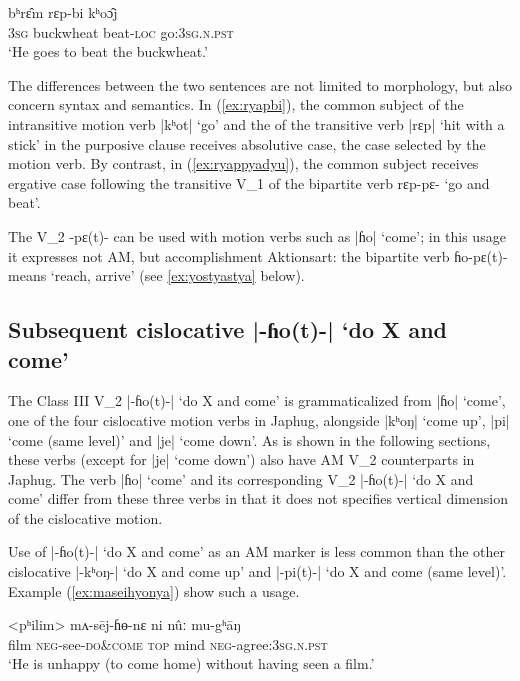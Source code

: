 \documentclass[oneside,a4paper,11pt]{article}
\newcommand{\ipa}[1]{{\phon#1}}
\newcommand{\dhatu}[2]{|\ipa{#1}| `#2'}
\begin{document}
\begin{exe}
\ex \label{ex:ryapbi}
 \gll   \ipa{ʔʌ̄m} \ipa{bʰrɛ̂m} \ipa{rɛp-bi} \ipa{kʰoɔ̂j}   \\
 \textsc{3sg} buckwheat beat-\textsc{loc} go:\textsc{3sg.n.pst} \\
 \glt `He goes to beat the buckwheat.'
    \end{exe}  
   
The differences between the two sentences are not limited to morphology, but also concern syntax and semantics. In  (\ref{ex:ryapbi}), the common subject of the intransitive motion verb \dhatu{kʰot}{go} and the of the transitive verb \dhatu{rɛp}{hit with a stick} in the purposive clause receives absolutive case, the case selected by the motion verb. By contrast, in (\ref{ex:ryappyadyu}), the common subject receives ergative case following the transitive V_1 of the bipartite verb \ipa{rɛp-pɛ-} `go and beat'.

The V_2 \ipa{-pɛ(t)-} can be used with motion verbs such as \dhatu{ɦo}{come}; in this usage it expresses not AM, but accomplishment Aktionsart: the bipartite verb \ipa{ɦo-pɛ(t)-} means `reach, arrive' (see \ref{ex:yostyastya} below).
    
\subsection{Subsequent cislocative \dhatu{-ɦo(t)-}{do X and come}} \label{sec:v2.ho}
The Class III V_2 \dhatu{-ɦo(t)-}{do X and come} is grammaticalized from \dhatu{ɦo}{come}, one of the four cislocative motion verbs in Japhug, alongside \dhatu{kʰoŋ}{come up}, \dhatu{pi}{come (same level)} and \dhatu{je}{come down}. As is shown in the following sections, these verbs (except for \dhatu{je}{come down}) also have AM V_2 counterparts in Japhug. The verb \dhatu{ɦo}{come} and its corresponding V_2  \dhatu{-ɦo(t)-}{do X and come} differ from these three verbs in that it does not specifies vertical dimension of the cislocative motion.

Use of \dhatu{-ɦo(t)-}{do X and come} as an AM marker is less common than the other cislocative  \dhatu{-kʰoŋ-}{do X and come up} and \dhatu{-pi(t)-}{do X and come (same level)}. Example (\ref{ex:maseihyonya}) show such a usage.

\begin{exe}
\ex \label{ex:maseihyonya}
 \gll  <pʰilim> \ipa{mʌ-sēj-ɦɵ-nɛ} \ipa{ni} \ipa{nûː} \ipa{mu-gʰāŋ} \\
 film \textsc{neg}-see-\textsc{do\&come} \textsc{top} mind \textsc{neg}-agree:\textsc{3sg.n.pst} \\
\glt `He is unhappy (to come home) without having seen a film.'
\end{exe}
\end{document}
